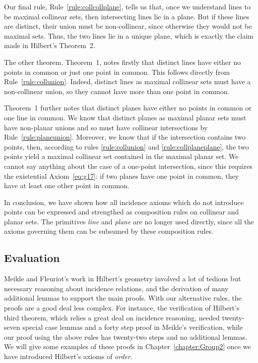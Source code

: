 Our final rule, Rule~\ref{rule:collcollplane}, tells us that, once we understand lines to be maximal collinear sets, then intersecting lines lie in a plane. But if these lines are distinct, their union must be non-collinear, since otherwise they would not be maximal sets. Thus, the two lines lie in a unique plane, which is exactly the claim made in Hilbert's Theorem~2. 

The other theorem, Theorem~1, notes firstly that distinct lines have either no points in common or just one point in common. This follows directly from Rule~\ref{rule:collunion}. Indeed, distinct lines as maximal collinear sets must have a non-collinear union, so they cannot have more than one point in common. 

Theorem~1 further notes that distinct planes have either no points in common or one line in common. We know that distinct planes as maximal planar sets must have non-planar unions and so must have collinear intersections by Rule~\ref{rule:planeunion}. Moreover, we know that if the intersection contains two points, then, according to rules \ref{rule:collunion} and \ref{rule:collplaneplane}, the two points yield a maximal collinear set contained in the maximal planar set. We cannot say anything about the case of a one-point intersection, since this requires the existential Axiom~\ref{eq:g17}: if two planes have one point in common, they have at least one other point in common.

In conclusion, we have shown how all incidence axioms which do not introduce points can be expressed and strengthed as composition rules on collinear and planar sets. The primitives \emph{line} and \emph{plane} are no longer used directly, since all the axioms governing them can be subsumed by these composition rules. 

\subsection{Evaluation}
Meikle and Fleuriot's work in Hilbert's geometry involved a lot of tedious but necessary reasoning about incidence relations, and the derivation of many additional lemmas to support the main proofs. With our alternative rules, the proofs are a good deal less complex. For instance, the verification of Hilbert's third theorem, which relies a great deal on incidence reasoning, needed twenty-seven special case lemmas and a forty step proof in Meikle's verification, while our proof using the above rules has twenty-two steps and no additional lemmas. We will give some examples of these proofs in Chapter~\ref{chapter:Group2} once we have introduced Hilbert's axioms of \emph{order}.

